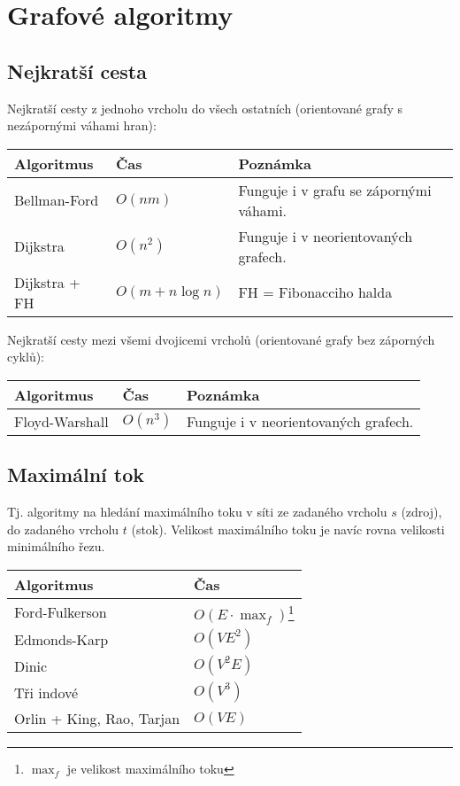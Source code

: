 \renewcommand{\arraystretch}{1.25}
\section{Grafové algoritmy}
\subsection{Nejkratší cesta}

Nejkratší cesty z jednoho vrcholu do všech ostatních (orientované grafy s
nezápornými váhami hran):

\begin{center}
\begin{tabular}{ l l p{8cm} }
	\hline
	\bf Algoritmus & \bf Čas & \bf Poznámka \\
	\hline
	Bellman-Ford & $O(nm)$ & Funguje i v grafu se zápornými váhami. \\
	Dijkstra & $O(n^2)$ & Funguje i v neorientovaných grafech. \\
	Dijkstra + FH & $O(m + n\log n)$ & FH = Fibonacciho halda \\
	\hline
\end{tabular}
\end{center}

\noindent Nejkratší cesty mezi všemi dvojicemi vrcholů (orientované grafy bez záporných cyklů):

\begin{center}
\begin{tabular}{ l l p{8cm} }
	\hline
	\bf Algoritmus & \bf Čas & \bf Poznámka \\
	\hline
	Floyd-Warshall & $O(n^3)$ & Funguje i v neorientovaných grafech. \\
	\hline
\end{tabular}
\end{center}

\subsection{Maximální tok}

Tj. algoritmy na hledání maximálního toku v síti ze zadaného vrcholu $s$
(zdroj), do zadaného vrcholu $t$ (stok). Velikost maximálního toku je navíc
rovna velikosti minimálního řezu.

\begin{center}
\begin{tabular}{ l l }
	\hline
	\bf Algoritmus & \bf Čas \\ 
	\hline
	Ford-Fulkerson & $O(E\cdot \max_f)$\footnote{$\max_f$ je velikost maximálního toku} \\
    Edmonds-Karp & $O(VE^2)$ \\
    Dinic & $O(V^2E)$ \\
	Tři indové & $O(V^3)$ \\
	Orlin + King, Rao, Tarjan & $O(VE)$ \\ 
    \hline
\end{tabular}
\end{center}

